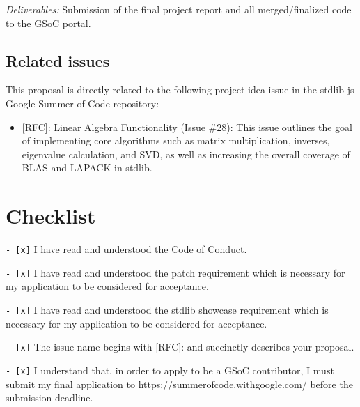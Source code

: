 \documentclass[
	a4paper,
	12pt
]{article}
\begin{document}
\textit{Deliverables:} Submission of the final project report and all merged/finalized code to the GSoC portal.

\subsection{Related issues}

This proposal is directly related to the following project idea issue in the stdlib-js Google Summer of Code repository:

\begin{itemize}
	\item {[RFC]}: Linear Algebra Functionality (Issue \#28): This issue outlines the goal of implementing core algorithms such as matrix multiplication, inverses, eigenvalue calculation, and SVD, as well as increasing the overall coverage of BLAS and LAPACK in stdlib.
\end{itemize}

\pagebreak
\section{Checklist}

\verb|- [x]| I have read and understood the Code of Conduct.

\verb|- [x]| I have read and understood the patch requirement which is necessary for my application to be considered for acceptance.

\verb|- [x]| I have read and understood the stdlib showcase requirement which is necessary for my application to be considered for acceptance.

\verb|- [x]| The issue name begins with [RFC]: and succinctly describes your proposal.

\verb|- [x]| I understand that, in order to apply to be a GSoC contributor, I must submit my final application to https://summerofcode.withgoogle.com/ before the submission deadline.
\end{document}
